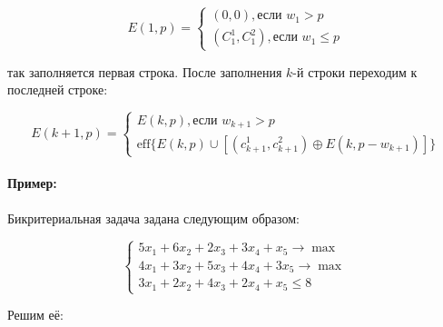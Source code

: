 $$
E(1, p) = \left\{
\begin{aligned}
(0, 0), \text{если $w_1 > p$} \\
(C_1^1, C_1^2), \text{если $w_1 \le p$}
\end{aligned}
\right.
$$

так заполняется первая строка. После заполнения $k$-й строки переходим к последней строке:

$$
E(k+1, p) = \left\{
\begin{aligned}
E(k, p), \text{если $w_{k+1} > p$} \\
\text{eff}\{E(k,p) \cup [(c_{k+1}^1, c_{k+1}^2) \oplus E(k, p - w_{k+1})]\}
\end{aligned}
\right.
$$

\paragraph*{Пример:}

Бикритериальная задача задана следующим образом:

$$
\left\{
\begin{aligned}
5x_1 + 6 x_2 + 2 x_3 + 3 x_4 + x_5 \to \max \\
4 x_1 + 3 x_2 + 5 x_3 + 4 x_4 + 3 x_5 \to \max \\
3 x_1 + 2 x_2 + 4 x_3 + 2 x_4 + x_5 \le 8
\end{aligned}
\right.
$$

Решим её:

